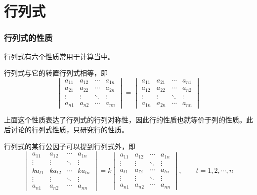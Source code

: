 \part{行列式}
\section{行列式的性质}
行列式有六个性质常用于计算当中。
\begin{property}
    行列式与它的转置行列式相等，即
    \[
        \begin{vmatrix}
            a_{11} & a_{12} & \cdots & a_{1n} \\
            a_{21} & a_{22} & \cdots & a_{2n} \\
            \vdots & \vdots & \ddots & \vdots \\
            a_{n1} & a_{n2} & \cdots & a_{nn}
        \end{vmatrix}
        =
        \begin{vmatrix}
            a_{11} & a_{21} & \cdots & a_{n1} \\
            a_{12} & a_{22} & \cdots & a_{n2} \\
            \vdots & \vdots & \ddots & \vdots \\
            a_{1n} & a_{2n} & \cdots & a_{nn}
        \end{vmatrix}
    \]
\end{property}
上面这个性质表达了行列式的行列对称性，因此行的性质也就等价于列的性质。此后讨论的行列式性质，只研究行的性质。

\begin{property}
    行列式的某行公因子可以提到行列式外，即
    \[
        \begin{vmatrix}
            a_{11}  & a_{12}  & \cdots & a_{1n}  \\
            \vdots  & \vdots  & \ddots & \vdots  \\
            ka_{t1} & ka_{t2} & \cdots & ka_{tn} \\
            \vdots  & \vdots  & \ddots & \vdots  \\
            a_{n1}  & a_{n2}  & \cdots & a_{nn}
        \end{vmatrix}
        = k
        \begin{vmatrix}
            a_{11} & a_{12} & \cdots & a_{1n} \\
            \vdots & \vdots & \ddots & \vdots \\
            a_{t1} & a_{t2} & \cdots & a_{tn} \\
            \vdots & \vdots & \ddots & \vdots \\
            a_{n1} & a_{n2} & \cdots & a_{nn}
        \end{vmatrix}
        , \qquad t = 1, 2, \cdots, n
    \]
\end{property}

